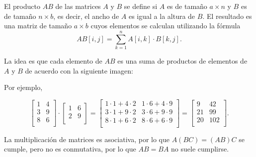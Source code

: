 El producto $AB$ de las matrices $A$ y $B$
se define si $A$ es de tamaño $a \times n$
y $B$ es de tamaño $n \times b$, es decir,
el ancho de $A$ es igual a la altura de $B$.
El resultado es una matriz de tamaño $a \times b$
cuyos elementos se calculan utilizando la fórmula
\[
AB[i,j] = \sum_{k=1}^n A[i,k] \cdot B[k,j].
\]

La idea es que cada elemento de $AB$
es una suma de productos de elementos de $A$ y $B$
de acuerdo con la siguiente imagen:

\begin{center}
\end{center}

Por ejemplo,

\[
 \begin{bmatrix}
  1 & 4 \\
  3 & 9 \\
  8 & 6 \\
 \end{bmatrix}
\cdot
 \begin{bmatrix}
  1 & 6 \\
  2 & 9 \\
 \end{bmatrix}
=
 \begin{bmatrix}
  1 \cdot 1 + 4 \cdot 2 & 1 \cdot 6 + 4 \cdot 9 \\
  3 \cdot 1 + 9 \cdot 2 & 3 \cdot 6 + 9 \cdot 9 \\
  8 \cdot 1 + 6 \cdot 2 & 8 \cdot 6 + 6 \cdot 9 \\
 \end{bmatrix}
=
 \begin{bmatrix}
  9 & 42 \\
  21 & 99 \\
  20 & 102 \\
 \end{bmatrix}.
\]

La multiplicación de matrices es asociativa,
por lo que $A(BC)=(AB)C$ se cumple,
pero no es conmutativa,
por lo que $AB = BA$ no suele cumplirse.


